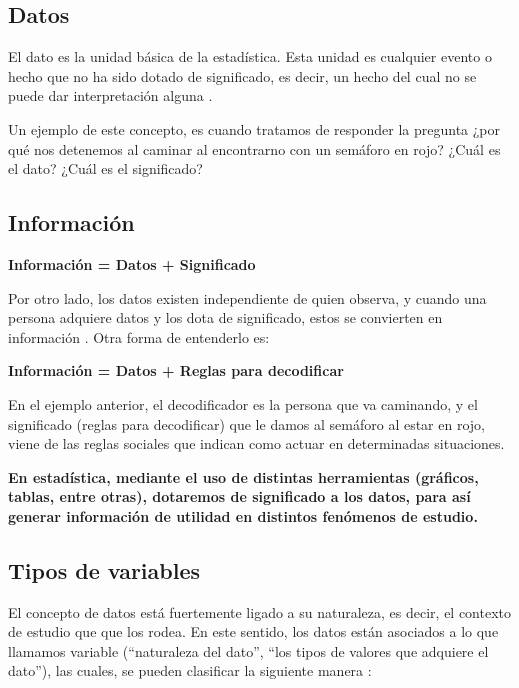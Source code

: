 \documentclass[
]{book}
\begin{document}
\hypertarget{datos}{%
\subsection{Datos}\label{datos}}

El dato es la unidad básica de la estadística. Esta unidad es cualquier evento o hecho que no ha sido dotado de significado, es decir, un hecho del cual no se puede dar interpretación alguna \citep{brachman_knowledge_2004}.

Un ejemplo de este concepto, es cuando tratamos de responder la pregunta ¿por qué nos detenemos al caminar al encontrarno con un semáforo en rojo? ¿Cuál es el dato? ¿Cuál es el significado?

\hypertarget{informaciuxf3n}{%
\subsection{Información}\label{informaciuxf3n}}

\textbf{Información = Datos + Significado}

Por otro lado, los datos existen independiente de quien observa, y cuando una persona adquiere datos y los dota de significado, estos se convierten en información \citep{brachman_knowledge_2004}. Otra forma de entenderlo es:

\textbf{Información = Datos + Reglas para decodificar}

En el ejemplo anterior, el decodificador es la persona que va caminando, y el significado (reglas para decodificar) que le damos al semáforo al estar en rojo, viene de las reglas sociales que indican como actuar en determinadas situaciones.

\textbf{En estadística, mediante el uso de distintas herramientas (gráficos, tablas, entre otras), dotaremos de significado a los datos, para así generar información de utilidad en distintos fenómenos de estudio.}

\hypertarget{tipos-de-variables}{%
\subsection{Tipos de variables}\label{tipos-de-variables}}

El concepto de datos está fuertemente ligado a su naturaleza, es decir, el contexto de estudio que que los rodea. En este sentido, los datos están asociados a lo que llamamos variable (``naturaleza del dato'', ``los tipos de valores que adquiere el dato''), las cuales, se pueden clasificar la siguiente manera \citep[página 7]{anderson_estadistica_2008}:
\end{document}
